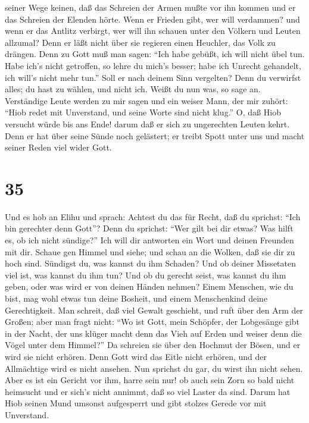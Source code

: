 seiner Wege keinen,  daß das Schreien der Armen mußte vor
ihn kommen und er das Schreien der Elenden hörte.  Wenn er
Frieden gibt, wer will verdammen? und wenn er das Antlitz verbirgt, wer
will ihn schauen unter den Völkern und Leuten allzumal? 
Denn er läßt nicht über sie regieren einen Heuchler, das Volk zu
drängen.  Denn zu Gott muß man sagen: ``Ich habe gebüßt,
ich will nicht übel tun.  Habe ich's nicht getroffen, so
lehre du mich's besser; habe ich Unrecht gehandelt, ich will's nicht
mehr tun.''  Soll er nach deinem Sinn vergelten? Denn du
verwirfst alles; du hast zu wählen, und nicht ich. Weißt du nun was, so
sage an.  Verständige Leute werden zu mir sagen und ein
weiser Mann, der mir zuhört:  ``Hiob redet mit Unverstand,
und seine Worte sind nicht klug.''  O, daß Hiob versucht
würde bis ans Ende! darum daß er sich zu ungerechten Leuten kehrt.
 Denn er hat über seine Sünde noch gelästert; er treibt
Spott unter uns und macht seiner Reden viel wider Gott.

\hypertarget{section-34}{%
\section{35}\label{section-34}}

 Und es hob an Elihu und sprach:  Achtest du das
für Recht, daß du sprichst: ``Ich bin gerechter denn Gott''?
 Denn du sprichst: ``Wer gilt bei dir etwas? Was hilft es,
ob ich nicht sündige?''  Ich will dir antworten ein Wort und
deinen Freunden mit dir.  Schaue gen Himmel und siehe; und
schau an die Wolken, daß sie dir zu hoch sind.  Sündigst du,
was kannst du ihm Schaden? Und ob deiner Missetaten viel ist, was kannst
du ihm tun?  Und ob du gerecht seist, was kannst du ihm
geben, oder was wird er von deinen Händen nehmen?  Einem
Menschen, wie du bist, mag wohl etwas tun deine Bosheit, und einem
Menschenkind deine Gerechtigkeit.  Man schreit, daß viel
Gewalt geschieht, und ruft über den Arm der Großen;  aber
man fragt nicht: ``Wo ist Gott, mein Schöpfer, der Lobgesänge gibt in
der Nacht,  der uns klüger macht denn das Vieh auf Erden
und weiser denn die Vögel unter dem Himmel?''  Da schreien
sie über den Hochmut der Bösen, und er wird sie nicht erhören.
 Denn Gott wird das Eitle nicht erhören, und der
Allmächtige wird es nicht ansehen.  Nun sprichst du gar, du
wirst ihn nicht sehen. Aber es ist ein Gericht vor ihm, harre sein nur!
 ob auch sein Zorn so bald nicht heimsucht und er sich's
nicht annimmt, daß so viel Laster da sind.  Darum hat Hiob
seinen Mund umsonst aufgesperrt und gibt stolzes Gerede vor mit
Unverstand.

